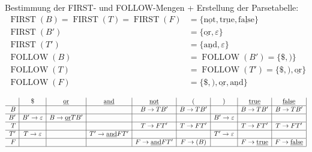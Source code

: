\documentclass[a4paper,10pt]{scrartcl}
\newcommand{\FIRST}{\operatorname{FIRST}}
\newcommand{\FOLLOW}{\operatorname{FOLLOW}}
\begin{document}
Bestimmung der FIRST- und FOLLOW-Mengen + Erstellung der Parsetabelle:
\begin{align*}
 \FIRST(B) = \FIRST(T) = \FIRST(F) &= \{\underline{\textrm{not}}, \underline{\textrm{true}}, \underline{\textrm{false}}\} \\
 \FIRST(B') &= \{\underline{\textrm{or}}, \varepsilon\} \\
 \FIRST(T') &= \{\underline{\textrm{and}}, \varepsilon\} \\\hline
 \FOLLOW(B) &= \FOLLOW(B') = \{\$, )\}\\
 \FOLLOW(T) &= \FOLLOW(T') = \{\$, ), \underline{\textrm{or}}\}\\
 \FOLLOW(F) &= \{\$, ), \underline{\textrm{or}}, \underline{\textrm{and}}\}
\end{align*}
    \renewcommand{\not}{\underline{\textrm{not}}}
    \newcommand{\true}{\underline{\textrm{true}}}
    \newcommand{\false}{\underline{\textrm{false}}}
    \newcommand{\e}{\varepsilon}
\begin{center}
    $\begin{array}{r|c|c|c|c|c|c|c|c|}
           & \$        & \underline{\textrm{or}}           & \underline{\textrm{and}}            & \not            & (         & )         & \true       & \false     \\\hline
        B  &           &               &                 & B \to TB'       & B \to TB' &           & B \to TB'   & B \to TB'  \\\hline
        B' & B' \to \e & B \to \underline{\textrm{or}} TB' &                 &                 &           & B' \to \e &             &            \\\hline
        T  &           &               &                 & T \to FT'       & T \to FT' &           & T \to FT'   & T \to FT'  \\\hline
        T' & T \to \e  &               & T' \to \underline{\textrm{and}} FT' &                 &           & T' \to \e &             &            \\\hline
        F  &           &               &                 & F \to \underline{\textrm{and}} FT'  & F \to (B) &           & F \to \true & F \to \false \\\hline
    \end{array}$
\end{center}
\end{document}
